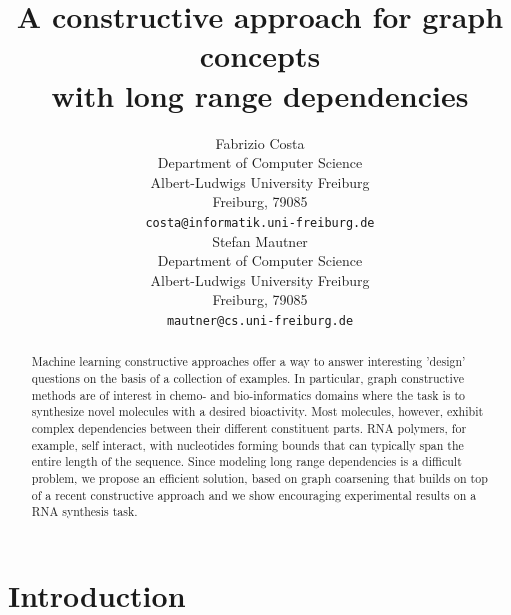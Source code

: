 \documentclass{article}
\title{A constructive approach for graph concepts\\with long range dependencies}
\author{
  Fabrizio Costa \\
  Department of Computer Science\\
  Albert-Ludwigs University Freiburg\\
  Freiburg, 79085  \\
  \texttt{costa@informatik.uni-freiburg.de} \\
  \And
  Stefan Mautner\\
  Department of Computer Science\\
  Albert-Ludwigs University Freiburg\\
  Freiburg, 79085  \\
  \texttt{mautner@cs.uni-freiburg.de} \\
}
\begin{document}

\maketitle

\begin{abstract}

Machine learning constructive approaches offer a way to answer interesting
'design' questions on the basis of a collection of examples.  In particular,
graph constructive methods are of interest in chemo- and bio-informatics
domains where the task is to synthesize novel molecules with a desired
bioactivity. Most molecules, however, exhibit complex dependencies between
their different constituent parts. RNA polymers, for example, self interact,
with nucleotides forming bounds that can typically span the entire length of
the sequence. Since modeling long range dependencies is a difficult problem,
we propose an efficient solution, based on graph coarsening that builds on top
of a recent constructive approach and we show encouraging experimental results
on a RNA synthesis task.

\end{abstract}
\section{Introduction}
\end{document}
